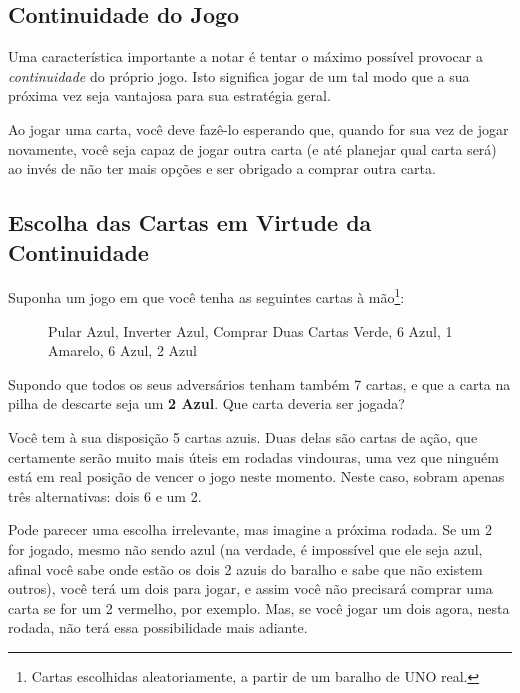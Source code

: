 \subsection{Continuidade do Jogo}

Uma característica importante a notar é tentar o máximo possível provocar a \textit{continuidade} do próprio jogo. Isto significa jogar de um tal modo que a sua próxima vez seja vantajosa para sua estratégia geral.

Ao jogar uma carta, você deve fazê-lo esperando que, quando for sua vez de jogar novamente, você seja capaz de jogar outra carta (e até planejar qual carta será) ao invés de não ter mais opções e ser obrigado a comprar outra carta.

\subsection{Escolha das Cartas em Virtude da Continuidade}

Suponha um jogo em que você tenha as seguintes cartas à mão\footnote{Cartas escolhidas aleatoriamente, a partir de um baralho de UNO real.}:

\begin{figure}[!h]
\centering
{}
\caption{Pular Azul, Inverter Azul, Comprar Duas Cartas Verde, 6 Azul, 1 Amarelo, 6 Azul, 2 Azul}
\end{figure}

Supondo que todos os seus adversários tenham também 7 cartas, e que a carta na pilha de descarte seja um \textbf{2 Azul}. Que carta deveria ser jogada?

Você tem à sua disposição 5 cartas azuis. Duas delas são cartas de ação, que certamente serão muito mais úteis em rodadas vindouras, uma vez que ninguém está em real posição de vencer o jogo neste momento. Neste caso, sobram apenas três alternativas: dois 6 e um 2.

Pode parecer uma escolha irrelevante, mas imagine a próxima rodada. Se um 2 for jogado, mesmo não sendo azul (na verdade, é impossível que ele seja azul, afinal você sabe onde estão os dois 2 azuis do baralho e sabe que não existem outros), você terá um dois para jogar, e assim você não precisará comprar uma carta se for um 2 vermelho, por exemplo. Mas, se você jogar um dois agora, nesta rodada, não terá essa possibilidade mais adiante.

